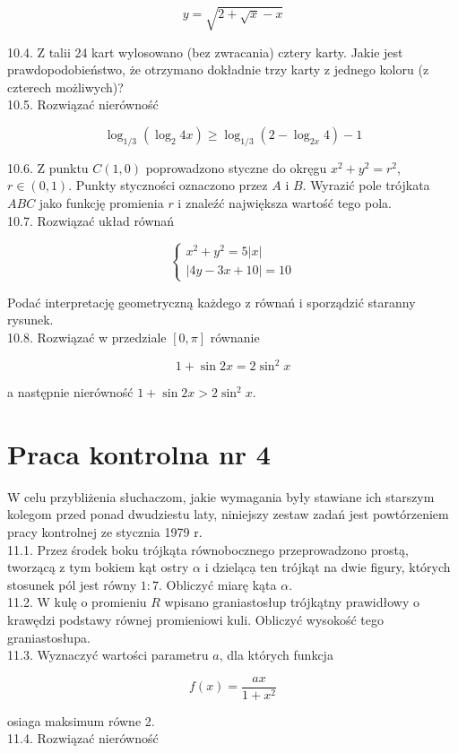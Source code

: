 \documentclass[10pt]{article}
\begin{document}
$$
y=\sqrt{2+\sqrt{x}-x}
$$

10.4. Z talii 24 kart wylosowano (bez zwracania) cztery karty. Jakie jest prawdopodobieństwo, że otrzymano dokładnie trzy karty z jednego koloru (z czterech możliwych)?\\
10.5. Rozwiązać nierówność

$$
\log _{1 / 3}\left(\log _{2} 4 x\right) \geq \log _{1 / 3}\left(2-\log _{2 x} 4\right)-1
$$

10.6. Z punktu $C(1,0)$ poprowadzono styczne do okręgu $x^{2}+y^{2}=r^{2}$, $r \in(0,1)$. Punkty styczności oznaczono przez $A$ i $B$. Wyrazić pole trójkata $A B C$ jako funkcję promienia $r$ i znaleźć największa wartość tego pola.\\
10.7. Rozwiązać układ równań

$$
\left\{\begin{array}{l}
x^{2}+y^{2}=5|x| \\
|4 y-3 x+10|=10
\end{array}\right.
$$

Podać interpretację geometryczną każdego z równań i sporządzić staranny rysunek.\\
10.8. Rozwiązać w przedziale $[0, \pi]$ równanie

$$
1+\sin 2 x=2 \sin ^{2} x
$$

a następnie nierówność $1+\sin 2 x>2 \sin ^{2} x$.

\section*{Praca kontrolna nr 4}
W celu przybliżenia słuchaczom, jakie wymagania były stawiane ich starszym kolegom przed ponad dwudziestu laty, niniejszy zestaw zadań jest powtórzeniem pracy kontrolnej ze stycznia 1979 r.\\
11.1. Przez środek boku trójkąta równobocznego przeprowadzono prostą, tworzącą z tym bokiem kąt ostry $\alpha$ i dzielącạ ten trójkąt na dwie figury, których stosunek pól jest równy $1: 7$. Obliczyć miarę kąta $\alpha$.\\
11.2. W kulę o promieniu $R$ wpisano graniastosłup trójkątny prawidłowy o krawędzi podstawy równej promieniowi kuli. Obliczyć wysokość tego graniastosłupa.\\
11.3. Wyznaczyć wartości parametru $a$, dla których funkcja

$$
f(x)=\frac{a x}{1+x^{2}}
$$

osiaga maksimum równe 2.\\
11.4. Rozwiązać nierówność
\end{document}

